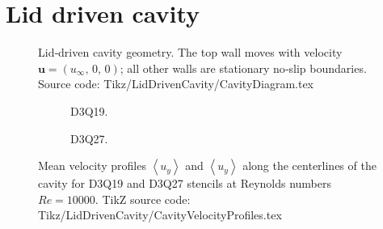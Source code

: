 \clearpage
\section{Lid driven cavity}
%
%
\begin{figure}[hbt]
    \centering
    
    \caption{Lid‑driven cavity geometry. The top wall moves with velocity $\boldsymbol{u} = \left(u_{\infty},\,0,\,0\right)$; all other walls are stationary no‑slip boundaries. Source code: Tikz/LidDrivenCavity/CavityDiagram.tex}
    \label{fig:lidDrivenCavityConfiguration}
\end{figure}
%
%
%
%
\begin{figure}[hbt!]
    \centering
    \begin{subfigure}{0.49\textwidth}
        \centering
        
        \caption{D3Q19.}
        \label{subfig:D3Q19_Re_10000}
    \end{subfigure}
    \hfill
    \begin{subfigure}{0.49\textwidth}
        \centering
        
        \caption{D3Q27.}
        \label{subfig:D3Q27_Re_10000}
    \end{subfigure}
    \caption{Mean velocity profiles $\left<u_{y}\right>$ and $\left<u_y\right>$ along the centerlines of the cavity for D3Q19 and D3Q27 stencils at Reynolds numbers $Re = \num{10000}$. TikZ source code: Tikz/LidDrivenCavity/CavityVelocityProfiles.tex}
    \label{fig:CavityVelocityProfilesCentreline}
\end{figure}